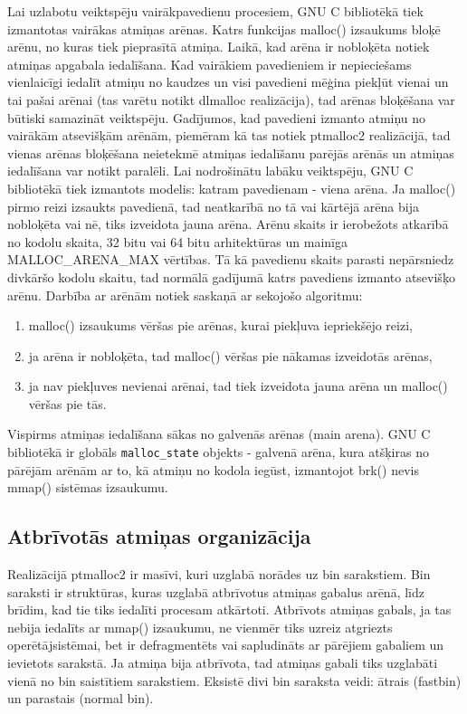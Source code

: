 Lai uzlabotu veiktspēju vairākpavedienu procesiem, GNU C bibliotēkā tiek izmantotas vairākas atmiņas arēnas. 
Katrs funkcijas malloc() izsaukums bloķē arēnu, no kuras tiek pieprasītā atmiņa. 
Laikā, kad arēna ir nobloķēta notiek atmiņas apgabala iedalīšana.
Kad vairākiem pavedieniem ir nepieciešams vienlaicīgi iedalīt atmiņu no kaudzes un visi pavedieni mēģina piekļūt vienai un tai pašai arēnai (tas varētu notikt dlmalloc realizācija), tad arēnas bloķēšana var būtiski samazināt veiktspēju.
Gadījumos, kad pavedieni izmanto atmiņu no vairākām atsevišķām arēnām, piemēram kā tas notiek ptmalloc2 realizācijā, tad vienas arēnas bloķēšana neietekmē atmiņas iedalīšanu parējās arēnās un atmiņas iedalīšana var notikt paralēli.
Lai nodrošinātu labāku veiktspēju, GNU C bibliotēkā tiek izmantots modelis: katram pavedienam - viena arēna. 
Ja malloc() pirmo reizi izsaukts pavedienā, tad neatkarībā no tā vai kārtējā arēna bija nobloķēta vai nē, tiks izveidota jauna arēna.
Arēnu skaits ir ierobežots atkarībā no kodolu skaita, 32 bitu vai 64 bitu arhitektūras un mainīga MALLOC\_ARENA\_MAX vērtības.
Tā kā pavedienu skaits parasti nepārsniedz divkāršo kodolu skaitu, tad normālā gadījumā katrs pavediens izmanto atsevišķo arēnu. 
Darbība ar arēnām notiek saskaņā ar sekojošo algoritmu: 
\begin{enumerate}
\item malloc() izsaukums vēršas pie arēnas, kurai piekļuva iepriekšējo reizi,
\item ja arēna ir nobloķēta, tad malloc() vēršas pie nākamas izveidotās arēnas,
\item ja nav piekļuves nevienai arēnai, tad tiek izveidota jauna arēna un malloc() vēršas pie tās.
\end{enumerate}
Vispirms atmiņas iedalīšana sākas no galvenās arēnas (main arena). 
GNU C bibliotēkā ir globāls \texttt{malloc\_state} objekts - galvenā arēna, kura atšķiras no pārējām arēnām ar to, kā atmiņu no kodola iegūst, izmantojot brk() nevis  mmap() sistēmas izsaukumu. 


 \subsection{Atbrīvotās atmiņas organizācija}
 \label{subsec:bin_saraksti}
Realizācijā ptmalloc2 ir masīvi, kuri uzglabā norādes uz bin sarakstiem.
Bin saraksti ir struktūras, kuras uzglabā atbrīvotus atmiņas gabalus arēnā, līdz brīdim, kad tie tiks iedalīti procesam atkārtoti.
Atbrīvots atmiņas gabals, ja tas nebija iedalīts ar mmap() izsaukumu, ne vienmēr tiks uzreiz atgriezts operētājsistēmai, bet ir defragmentēts vai sapludināts ar pārējiem gabaliem un ievietots sarakstā. 
Ja atmiņa bija atbrīvota, tad atmiņas gabali tiks uzglabāti vienā no bin saistītiem sarakstiem.
Eksistē divi bin saraksta veidi: ātrais (fastbin) un parastais (normal bin).

